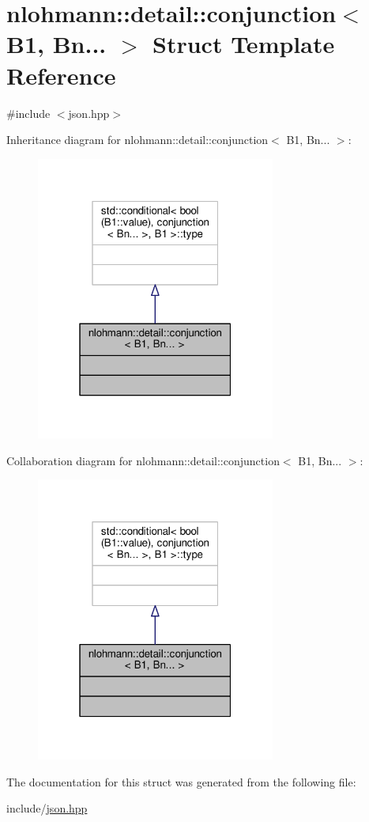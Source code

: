 \hypertarget{structnlohmann_1_1detail_1_1conjunction_3_01B1_00_01Bn_8_8_8_01_4}{}\section{nlohmann\+:\+:detail\+:\+:conjunction$<$ B1, Bn... $>$ Struct Template Reference}
\label{structnlohmann_1_1detail_1_1conjunction_3_01B1_00_01Bn_8_8_8_01_4}


{\ttfamily \#include $<$json.\+hpp$>$}



Inheritance diagram for nlohmann\+:\+:detail\+:\+:conjunction$<$ B1, Bn... $>$\+:
\nopagebreak
\begin{figure}[H]
\begin{center}
\leavevmode
\includegraphics[width=223pt]{structnlohmann_1_1detail_1_1conjunction_3_01B1_00_01Bn_8_8_8_01_4__inherit__graph}
\end{center}
\end{figure}


Collaboration diagram for nlohmann\+:\+:detail\+:\+:conjunction$<$ B1, Bn... $>$\+:
\nopagebreak
\begin{figure}[H]
\begin{center}
\leavevmode
\includegraphics[width=223pt]{structnlohmann_1_1detail_1_1conjunction_3_01B1_00_01Bn_8_8_8_01_4__coll__graph}
\end{center}
\end{figure}


The documentation for this struct was generated from the following file\+:\begin{DoxyCompactItemize}
\item 
include/\hyperlink{json_8hpp}{json.\+hpp}\end{DoxyCompactItemize}
